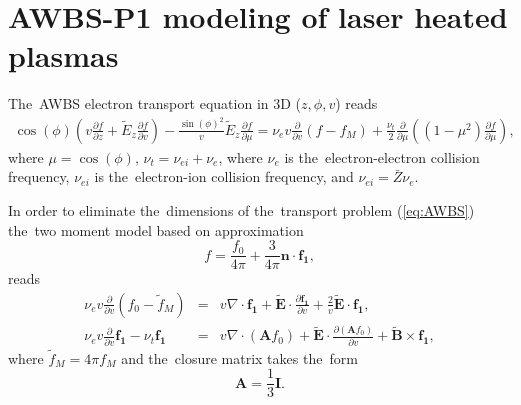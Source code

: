\documentclass[preprint,12pt]{elsarticle}
\newcommand{\pdv}[2]{\frac{\partial{#1}}{\partial{#2}}}
\newcommand{\vect}[1]{\boldsymbol{#1}}
\newcommand{\matr}[1]{\mathbf{#1}}
\newcommand{\Zbar}{\bar{Z}}
\newcommand{\nue}{\nu_{e}}
\newcommand{\nuei}{\nu_{ei}}
\newcommand{\nutot}{\nu_{t}}
\newcommand{\vmag}{v}
\newcommand{\vn}{\vect{n}}
\newcommand{\tE}{\vect{\tilde{E}}}
\newcommand{\tEz}{\tilde{E}_z}
\newcommand{\tB}{\vect{\tilde{B}}}
\newcommand{\fM}{f_M}
\newcommand{\tfM}{\tilde{f}_M}
\newcommand{\fzero}{f_0}
\newcommand{\fone}{\vect{f_1}}
\newcommand{\MI}{\matr{I}}
\newcommand{\MA}{\matr{A}}
\newcommand{\refeq}[1]{(\ref{#1})}
\newcounter{bla}
\begin{document}
\section{AWBS-P1 modeling of laser heated plasmas}\label{sec:OOE_AWBSP1}
The~AWBS electron transport equation in 3D ($z, \phi, \vmag$) reads
\begin{multline}
  \cos(\phi) \left(\vmag\pdv{f}{z} + \tEz\pdv{f}{\vmag}\right) 
  - \frac{\sin(\phi)^2}{\vmag} \tEz \pdv{f}{\mu}
  =
  \nue\vmag\pdv{}{\vmag}\left(f - f_M\right) 
  + \frac{\nu_t}{2}
  \pdv{}{\mu}\left((1 - \mu^2)\pdv{f}{\mu}\right) ,
  \label{eq:OOE_AWBS_simple}
\end{multline}
where $\mu = \cos(\phi)$, $\nu_t = \nuei + \nue$, where $\nue$ is 
the~electron-electron collision frequency, $\nuei$ is the~electron-ion 
collision frequency, and $\nuei = \Zbar \nue$.

In order to eliminate the~dimensions of the~transport problem \refeq{eq:AWBS}
the~two moment model based on approximation 
\begin{equation}
  f = \frac{\fzero}{4\pi} + \frac{3}{4\pi}\vn\cdot\fone , 
  \label{eq:OOE_P1approximation}
\end{equation}
reads
\begin{eqnarray}
  \nue\vmag\pdv{}{\vmag}\left(\fzero - \tfM \right) &=&
  \vmag\nabla\cdot\fone + \tE\cdot
  \pdv{\fone}{\vmag} + \frac{2}{\vmag}\tE\cdot\fone , 
  \label{eq:OOE_P1f0}\\
  \nue\vmag\pdv{}{\vmag}\fone - \nutot\fone &=& 
  \vmag\nabla\cdot\left(\MA\fzero\right) + 
  \tE\cdot\pdv{\left(\MA\fzero\right)}{\vmag} + \tB\times\fone ,
  \label{eq:OOE_P1f1}
\end{eqnarray}
where $\tfM = 4\pi \fM$ and the~closure matrix takes the~form
\begin{equation}
  \MA = \frac{1}{3}\MI .
  \label{eq:OOE_P1closure}
\end{equation}
\end{document}
